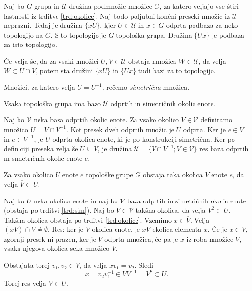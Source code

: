 \documentclass[mat1]{fmfdelo}
\newcommand{\Ucurl}{\mathcal{U}}
\newcommand{\closure}[1]{\overline{#1}}
\begin{document}
\begin{izrek}\label{izr:bazaokolice}
Naj bo $G$ grupa in $\Ucurl$ družina podmnožic množice $G$, za katero veljajo vse štiri lastnosti iz trditve \ref{trd:okolice}. Naj bodo poljubni končni preseki množic iz $\Ucurl$ neprazni. Tedaj je družina $\lbrace xU \rbrace$, kjer $U \in \Ucurl$ in $x \in G$ odprta podbaza za neko topologijo na $G$. S to topologijo je $G$ topološka grupa. Družina $\lbrace Ux \rbrace$ je podbaza za isto topologijo.

Če velja še, da za vsaki množici $U,V \in \Ucurl$ obstaja množica $W \in \Ucurl$, da velja $W \subset U \cap V$, potem sta družini $\lbrace xU \rbrace$ in $\lbrace Ux \rbrace$ tudi bazi za to topologijo.
\end{izrek}

\begin{definicija}\label{def:sim}
Množici, za katero velja $U = U^{-1}$, rečemo \emph{simetrična} množica.
\end{definicija}

\begin{trditev}\label{trd:sim}
Vsaka topološka grupa ima bazo $\Ucurl$ odprtih in simetričnih okolic enote.
\end{trditev}

\begin{dokaz}
Naj bo $\mathcal{V}$ neka baza odprtih okolic enote. Za vsako okolico $V \in \mathcal{V}$ definiramo množico $U = V \cap V^{-1}$. Kot presek dveh odprtih množic je $U$ odprta. Ker je $e \in V$ in $e \in V^{-1}$, je $U$ odprta okolica enote, ki je po konstrukciji simetrična. Ker po definiciji preseka velja še $U \subseteq V$, je družina $\Ucurl = \lbrace V \cap V^{-1}; V \in \mathcal{V} \rbrace$ res baza odprtih in simetričnih okolic enote $e$.
\end{dokaz}

\begin{posledica}\label{pos:sim}
Za vsako okolico $U$ enote $e$ topološke grupe $G$ obstaja taka okolica $V$ enote $e$, da velja $\closure{V} \subset U$.
\end{posledica}

\begin{dokaz}
Naj bo $U$ neka okolica enote in naj bo $\mathcal{V}$ baza odprtih in simetričnih okolic enote (obstaja po trditvi \ref{trd:sim}). Naj bo $V \in \mathcal{V}$ takšna okolica, da velja $V^2 \subset U$. Takšna okolica obstaja po trditvi \ref{trd:okolice}. Vzemimo $x \in \closure{V}$. Velja $(xV) \cap V \neq \emptyset$.
Res: ker je $V$ okolica enote, je $xV$ okolica elementa $x$. Če je $x \in V$, zgornji presek ni prazen, ker je $V$ odprta množica, če pa je $x$ iz roba množice $V$, vsaka njegova okolica seka množico $V$.

Obstajata torej $v_1, v_2 \in V$, da velja $x v_1 = v_2$. Sledi \[x = v_2 v_1^{-1} \in VV^{-1} = V^2 \subset U.\]
Torej res velja $\closure{V} \subset U$.
\end{dokaz}
\end{document}
